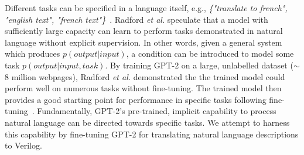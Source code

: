 Different tasks can be specified in a language itself, e.g., \emph{\{"translate to french", "english text", "french text"\}}~\cite{radford2019language}.
Radford \textit{et al.} speculate that a model with sufficiently large capacity can learn to perform tasks demonstrated in natural language without explicit supervision. 
In other words, given a general system which produces $p(output|input)$, a condition can be introduced to model some task $p(output|input,task)$. 
By training GPT-2 on a large, unlabelled dataset ($\sim$8 million webpages), Radford \textit{et al.} demonstrated the the trained model could perform well on numerous tasks without fine-tuning. 
The trained model then provides a good starting point for performance in specific tasks following fine-tuning~\cite{radford_improving_nodate}. 
Fundamentally, GPT-2's pre-trained, implicit capability to process natural language can be directed towards specific tasks. %
We attempt to harness this capability by fine-tuning GPT-2 for translating natural language descriptions to Verilog. 







